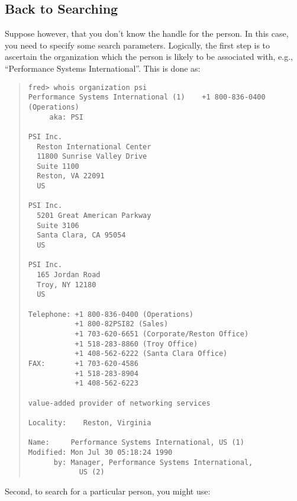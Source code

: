 \subsection	{Back to Searching}
Suppose however,
that you don't know the handle for the person.
In this case,
you need to specify some search parameters.
Logically,
the first step is to ascertain the organization which the person is likely to
be associated with, e.g.,
``Performance Systems International''.
This is done as:
\begin{quote}\small\begin{verbatim}
fred> whois organization psi
Performance Systems International (1)    +1 800-836-0400 (Operations)
     aka: PSI

PSI Inc.
  Reston International Center
  11800 Sunrise Valley Drive
  Suite 1100
  Reston, VA 22091
  US

PSI Inc.
  5201 Great American Parkway
  Suite 3106
  Santa Clara, CA 95054
  US

PSI Inc.
  165 Jordan Road
  Troy, NY 12180
  US

Telephone: +1 800-836-0400 (Operations)
           +1 800-82PSI82 (Sales)
           +1 703-620-6651 (Corporate/Reston Office)
           +1 518-283-8860 (Troy Office)
           +1 408-562-6222 (Santa Clara Office)
FAX:       +1 703-620-4586
           +1 518-283-8904
           +1 408-562-6223

value-added provider of networking services

Locality:    Reston, Virginia

Name:     Performance Systems International, US (1)
Modified: Mon Jul 30 05:18:24 1990
      by: Manager, Performance Systems International,
            US (2)
\end{verbatim}\end{quote}
Second,
to search for a particular person,
you might use:
